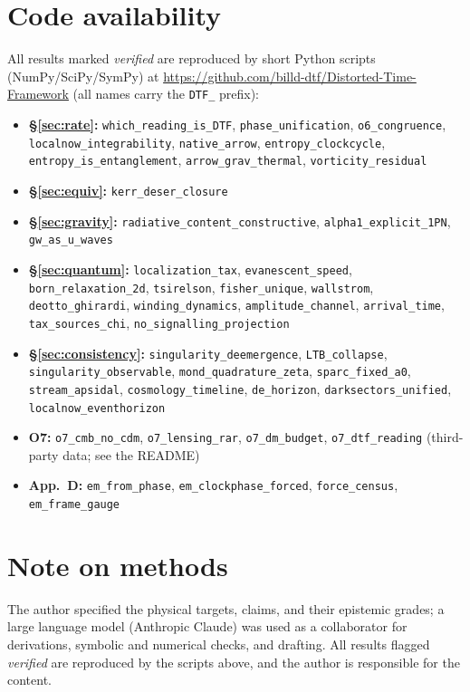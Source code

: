 \documentclass[11pt]{article}
\begin{document}
\section*{Code availability}
\small All results marked \emph{verified} are reproduced by short Python scripts (NumPy/SciPy/SymPy) at
\url{https://github.com/billd-dtf/Distorted-Time-Framework} (all names carry the \texttt{DTF\_} prefix):
\begin{itemize}[leftmargin=1.4em,itemsep=1.5pt,topsep=2pt]
\item \textbf{\S\ref{sec:rate}:} \texttt{which\_reading\_is\_DTF}, \texttt{phase\_unification}, \texttt{o6\_congruence}, \texttt{localnow\_integrability}, \texttt{native\_arrow}, \texttt{entropy\_clockcycle}, \texttt{entropy\_is\_entanglement}, \texttt{arrow\_grav\_thermal}, \texttt{vorticity\_residual}
\item \textbf{\S\ref{sec:equiv}:} \texttt{kerr\_deser\_closure}
\item \textbf{\S\ref{sec:gravity}:} \texttt{radiative\_content\_constructive}, \texttt{alpha1\_explicit\_1PN}, \texttt{gw\_as\_u\_waves}
\item \textbf{\S\ref{sec:quantum}:} \texttt{localization\_tax}, \texttt{evanescent\_speed}, \texttt{born\_relaxation\_2d}, \texttt{tsirelson}, \texttt{fisher\_unique}, \texttt{wallstrom}, \texttt{deotto\_ghirardi}, \texttt{winding\_dynamics}, \texttt{amplitude\_channel}, \texttt{arrival\_time}, \texttt{tax\_sources\_chi}, \texttt{no\_signalling\_projection}
\item \textbf{\S\ref{sec:consistency}:} \texttt{singularity\_deemergence}, \texttt{LTB\_collapse}, \texttt{singularity\_observable}, \texttt{mond\_quadrature\_zeta}, \texttt{sparc\_fixed\_a0}, \texttt{stream\_apsidal}, \texttt{cosmology\_timeline}, \texttt{de\_horizon}, \texttt{darksectors\_unified}, \texttt{localnow\_eventhorizon}
\item \textbf{O7:} \texttt{o7\_cmb\_no\_cdm}, \texttt{o7\_lensing\_rar}, \texttt{o7\_dm\_budget}, \texttt{o7\_dtf\_reading} (third-party data; see the README)
\item \textbf{App.\ D:} \texttt{em\_from\_phase}, \texttt{em\_clockphase\_forced}, \texttt{force\_census}, \texttt{em\_frame\_gauge}
\end{itemize}

\section*{Note on methods}
\small The author specified the physical targets, claims, and their epistemic grades; a large language model
(Anthropic Claude) was used as a collaborator for derivations, symbolic and numerical checks, and drafting.
All results flagged \emph{verified} are reproduced by the scripts above, and the author is responsible for the
content.
\end{document}

